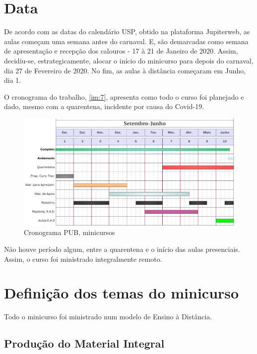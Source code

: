 \documentclass[
12pt,				%
openright,			%
oneside,			%
a4paper,			%
english,			%
french,				%
spanish,			%
brazil,				%
]{abntex2}
\begin{document}
\section{Data}
De acordo com as datas do calendário USP, obtido na plataforma
Jupiterweb, as aulas começam uma semana antes do carnaval. E, são
demarcadas como semana de apresentação e recepção dos calouros - 17 à
21 de Janeiro de 2020. Assim,
decidiu-se, estrategicamente, alocar o início do minicurso para depois
do carnaval, dia 27 de Fevereiro de 2020. No fim, as aulas à distância começaram em Junho, dia
1.

O cronograma do trabalho, \autoref{im:7}, apresenta como todo o curso
foi planejado e dado, mesmo com a quarentena, incidente por causa do Covid-19.

\begin{figure}[!htb]
  \caption{\label{im:7} Cronograma PUB, minicursos}
  \begin{center}
    \includegraphics[scale=0.27]{./Imagens/9.png}
  \end{center}
\end{figure}

Não houve período algum, entre a quarentena e o início das aulas
presenciais. Assim, o curso foi ministrado integralmente remoto.

\clearpage

\section{Definição dos temas do minicurso}

Todo o minicurso foi ministrado num modelo de
Ensino à Distância.

\subsection{Produção do Material Integral}
\end{document}
